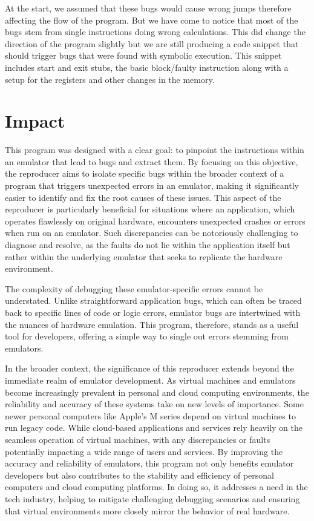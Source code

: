 At the start, we assumed that these bugs would cause wrong jumps therefore affecting the flow of the program.
But we have come to notice that most of the bugs stem from single instructions doing wrong calculations.
This did change the direction of the program slightly but we are still producing a code snippet that should trigger bugs that were found with symbolic execution.
This snippet includes start and exit stubs, the basic block/faulty instruction along with a setup for the registers and other changes in the memory.

\section{Impact}
This program was designed with a clear goal: to pinpoint the instructions within an emulator that lead to bugs and extract them.
By focusing on this objective, the reproducer aims to isolate specific bugs within the broader context of a program that triggers unexpected errors in an emulator, making it significantly easier to identify and fix the root causes of these issues.
This aspect of the reproducer is particularly beneficial for situations where an application, which operates flawlessly on original hardware, encounters unexpected crashes or errors when run on an emulator.
Such discrepancies can be notoriously challenging to diagnose and resolve, as the faults do not lie within the application itself but rather within the underlying emulator that seeks to replicate the hardware environment.

The complexity of debugging these emulator-specific errors cannot be understated.
Unlike straightforward application bugs, which can often be traced back to specific lines of code or logic errors, emulator bugs are intertwined with the nuances of hardware emulation.
This program, therefore, stands as a useful tool for developers, offering a simple way to single out errors stemming from emulators.

In the broader context, the significance of this reproducer extends beyond the immediate realm of emulator development.
As virtual machines and emulators become increasingly prevalent in personal and cloud computing environments, the reliability and accuracy of these systems take on new levels of importance.
Some newer personal computers like Apple's M series depend on virtual machines \cite{rosetta} to run legacy code.
While cloud-based applications and services rely heavily on the seamless operation of virtual machines, with any discrepancies or faults potentially impacting a wide range of users and services.
By improving the accuracy and reliability of emulators, this program not only benefits emulator developers but also contributes to the stability and efficiency of personal computers and cloud computing platforms.
In doing so, it addresses a need in the tech industry, helping to mitigate challenging debugging scenarios and ensuring that virtual environments more closely mirror the behavior of real hardware.
